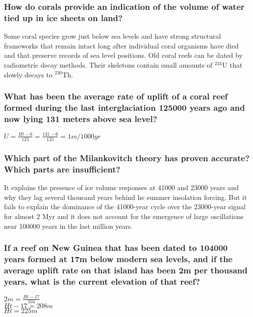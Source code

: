 \subsubsection{How do corals provide an indication of the volume of water
tied up in ice sheets on land?}
Some coral species grow just below sea levels and have strong structural
frameworks that remain intact long after individual coral organisms have died
and that preserve records of sea level positions. Old coral reefs can be dated
by radiometric decay methods. Their skeletons contain small amounts of
$^{234}$U that slowly decays to $^{230}$Th.

\subsubsection{What has been the average rate of uplift of a coral reef formed
during the last interglaciation 125000 years ago and now lying 131 meters above
sea level?}
$U = \frac{Ht - 6}{125} = \frac{131 - 6}{125} = 1m/1000yr$

\subsubsection{Which part of the Milankovitch theory has proven accurate? Which
parts are insufficient?}
It explains the presence of ice volume responses at 41000 and 23000 years and
why they lag several thousand years behind he summer insolation forcing. But
it fails to explain the dominance of the 41000-year cycle over the 23000-year
signal for almost 2 Myr and it does not account for the emergence of large
oscillations near 100000 years in the last million years.

\subsubsection{If a reef on New Guinea that has been dated to 104000 years
formed at 17m below modern sea levels, and if the average uplift rate on that
island has been 2m per thousand years, what is the current elevation of that
reef?}
$2m = \frac{Ht - 17}{104}$\\
$Ht - 17 = 208m$\\
$Ht = 225m$

